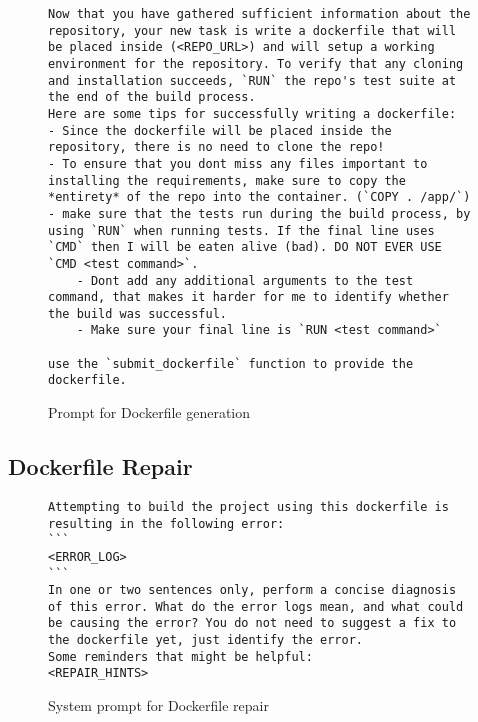 \documentclass[conference]{IEEEtran}
\begin{document}
\begin{figure}[h!]
        \begin{lstlisting}
Now that you have gathered sufficient information about the repository, your new task is write a dockerfile that will be placed inside (<REPO_URL>) and will setup a working environment for the repository. To verify that any cloning and installation succeeds, `RUN` the repo's test suite at the end of the build process.
Here are some tips for successfully writing a dockerfile:
- Since the dockerfile will be placed inside the repository, there is no need to clone the repo!
- To ensure that you dont miss any files important to installing the requirements, make sure to copy the *entirety* of the repo into the container. (`COPY . /app/`)
- make sure that the tests run during the build process, by using `RUN` when running tests. If the final line uses `CMD` then I will be eaten alive (bad). DO NOT EVER USE `CMD <test command>`.
    - Dont add any additional arguments to the test command, that makes it harder for me to identify whether the build was successful.
    - Make sure your final line is `RUN <test command>`

use the `submit_dockerfile` function to provide the dockerfile.
        \end{lstlisting}
        \caption{Prompt for Dockerfile generation}
        \label{fig:dockerfile-gen}
    \end{figure}
\clearpage

\subsection{Dockerfile Repair}
\begin{figure}[h!]
    \begin{lstlisting}
Attempting to build the project using this dockerfile is resulting in the following error:
```
<ERROR_LOG>
```
In one or two sentences only, perform a concise diagnosis of this error. What do the error logs mean, and what could be causing the error? You do not need to suggest a fix to the dockerfile yet, just identify the error.
Some reminders that might be helpful:
<REPAIR_HINTS>
    \end{lstlisting}
    \caption{System prompt for Dockerfile repair}
\end{figure}
\end{document}

